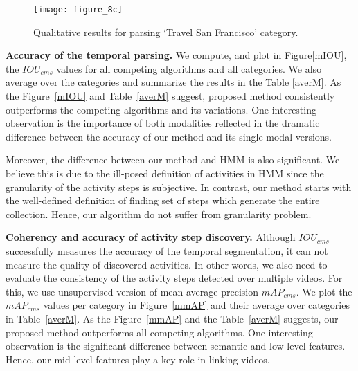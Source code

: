 \begin{figure}[t]
  \texttt{[image: figure\_8c]}
  \vspace{-6mm}
  \caption{Qualitative results for parsing `Travel San Francisco' category.}
  \vspace{-2mm}
  \label{sf}
\end{figure}


\vspace{1mm}
\noindent\textbf{Accuracy of the temporal parsing.}
We compute, and plot in Figure\ref{mIOU}, the $IOU_{cms}$ values for all competing algorithms and all categories. We also average over the categories and summarize the results in the Table \ref{averM}. As the Figure~\ref{mIOU} and Table~\ref{averM} suggest, proposed method consistently outperforms the competing algorithms and its variations. One interesting observation is the importance of both modalities reflected in the dramatic difference between the accuracy of our method and its single modal versions.

Moreover, the difference between our method and HMM is also significant. We believe this is due to the ill-posed definition of activities in HMM since the granularity of the activity steps is subjective. In contrast, our method starts with the well-defined definition of finding set of steps which generate the entire collection. Hence, our algorithm do not suffer from granularity problem.
\begin{table}
\caption{Average $IOU_{cms}$ and $mAP_{cms}$ over all categories.}
{\small
{}}
\normalsize
\label{averM}
\vspace{-5mm}
\end{table}

\vspace{1mm}
\noindent\textbf{Coherency and accuracy of activity step discovery.}
Although $IOU_{cms}$ successfully measures the accuracy of the temporal segmentation, it can not measure the quality of discovered activities. In other words, we also need to evaluate the consistency of the activity steps detected over multiple videos. For this, we use unsupervised version of mean average precision $mAP_{cms}$. We plot the $mAP_{cms}$ values per category in Figure~\ref{mmAP} and their average over categories in Table~\ref{averM}. As the Figure~\ref{mmAP} and the Table~\ref{averM} suggests, our proposed method outperforms all competing algorithms. One interesting observation is the significant difference between semantic and low-level features. Hence, our mid-level features play a key role in linking videos.

